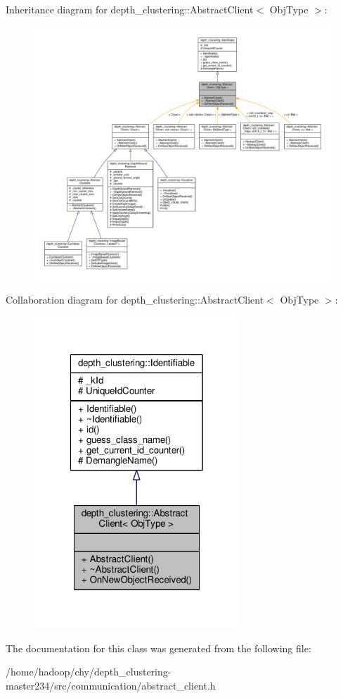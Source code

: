 Inheritance diagram for depth\-\_\-clustering\-:\-:Abstract\-Client$<$ Obj\-Type $>$\-:
\nopagebreak
\begin{figure}[H]
\begin{center}
\leavevmode
\includegraphics[width=350pt]{classdepth__clustering_1_1AbstractClient__inherit__graph}
\end{center}
\end{figure}


Collaboration diagram for depth\-\_\-clustering\-:\-:Abstract\-Client$<$ Obj\-Type $>$\-:
\nopagebreak
\begin{figure}[H]
\begin{center}
\leavevmode
\includegraphics[width=220pt]{classdepth__clustering_1_1AbstractClient__coll__graph}
\end{center}
\end{figure}


The documentation for this class was generated from the following file\-:\begin{DoxyCompactItemize}
\item 
/home/hadoop/chy/depth\-\_\-clustering-\/master234/src/communication/abstract\-\_\-client.\-h\end{DoxyCompactItemize}
